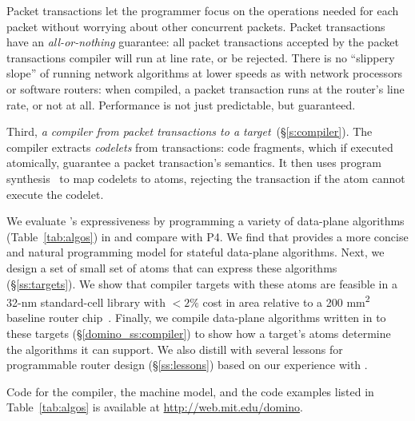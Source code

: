 Packet transactions let the programmer focus on the operations needed for each
packet without worrying about other concurrent packets. Packet transactions
have an \textit{all-or-nothing} guarantee: all packet transactions accepted by
the packet transactions compiler will run at line rate, or be rejected.  There
is no ``slippery slope'' of running network algorithms at lower speeds as with
network processors or software routers: when compiled, a packet transaction
runs at the router's line rate, or not at all.  Performance is not just
predictable, but guaranteed.

Third, {\em a compiler from \pktlanguage packet transactions to a \absmachine
target}~(\S\ref{s:compiler}). The \pktlanguage compiler extracts {\em codelets}
from  transactions: code fragments, which if executed atomically, guarantee a
packet transaction's semantics. It then uses program
synthesis~\cite{sketch_asplos} to map codelets to atoms, rejecting the
transaction if the atom cannot execute the codelet.

We evaluate \pktlanguage's expressiveness by programming a variety of
data-plane algorithms (Table~\ref{tab:algos}) in \pktlanguage and compare with
P4. We find that \pktlanguage provides a more concise and natural programming
model for stateful data-plane algorithms.  Next, we design a set of small set
of atoms that can express these algorithms (\S\ref{ss:targets}).  We show that
compiler targets with these atoms are feasible in a 32-nm standard-cell library
with $< 2\%$ cost in area relative to a 200 \si{\milli\metre\squared} baseline
router chip~\cite{gibb_parsing}.  Finally, we compile data-plane algorithms
written in \pktlanguage to these targets (\S\ref{domino_ss:compiler}) to show
how a target's atoms determine the algorithms it can support. We also distill
with several lessons for programmable router design (\S\ref{ss:lessons}) based
on our experience with \pktlanguage.

Code for the \pktlanguage compiler, the \absmachine machine model, and the code
examples listed in Table~\ref{tab:algos} is available at
\url{http://web.mit.edu/domino}.
